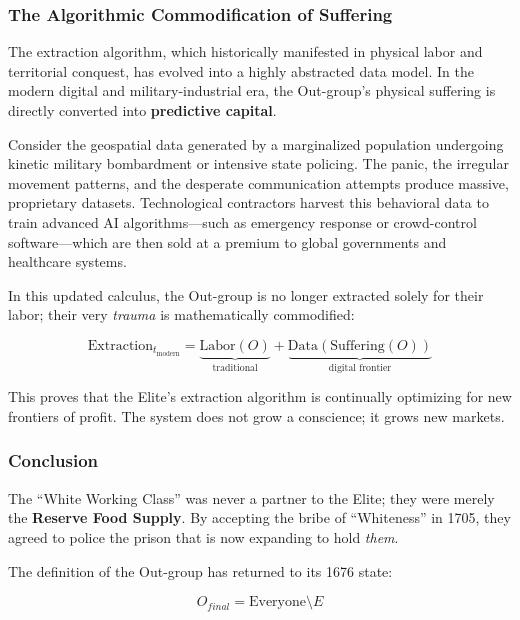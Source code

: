 \documentclass[12pt]{article}
\begin{document}
\subsubsection*{The Algorithmic Commodification of Suffering}

The extraction algorithm, which historically manifested in physical labor and territorial conquest, has evolved into a highly abstracted data model. In the modern digital and military-industrial era, the Out-group's physical suffering is directly converted into \textbf{predictive capital}.

Consider the geospatial data generated by a marginalized population undergoing kinetic military bombardment or intensive state policing. The panic, the irregular movement patterns, and the desperate communication attempts produce massive, proprietary datasets. Technological contractors harvest this behavioral data to train advanced AI algorithms---such as emergency response or crowd-control software---which are then sold at a premium to global governments and healthcare systems.

In this updated calculus, the Out-group is no longer extracted solely for their labor; their very \textit{trauma} is mathematically commodified:

\[
\text{Extraction}_{t_{\text{modern}}} = \underbrace{\text{Labor}(O)}_{\text{traditional}} + \underbrace{\text{Data}(\text{Suffering}(O))}_{\text{digital frontier}}
\]

This proves that the Elite's extraction algorithm is continually optimizing for new frontiers of profit. The system does not grow a conscience; it grows new markets.

\subsubsection*{Conclusion}
The ``White Working Class'' was never a partner to the Elite; they were merely the \textbf{Reserve Food Supply}. By accepting the bribe of ``Whiteness'' in 1705, they agreed to police the prison that is now expanding to hold \textit{them}.

The definition of the Out-group has returned to its 1676 state:

\[
O_{final} = \text{Everyone} \setminus E
\]
\end{document}
